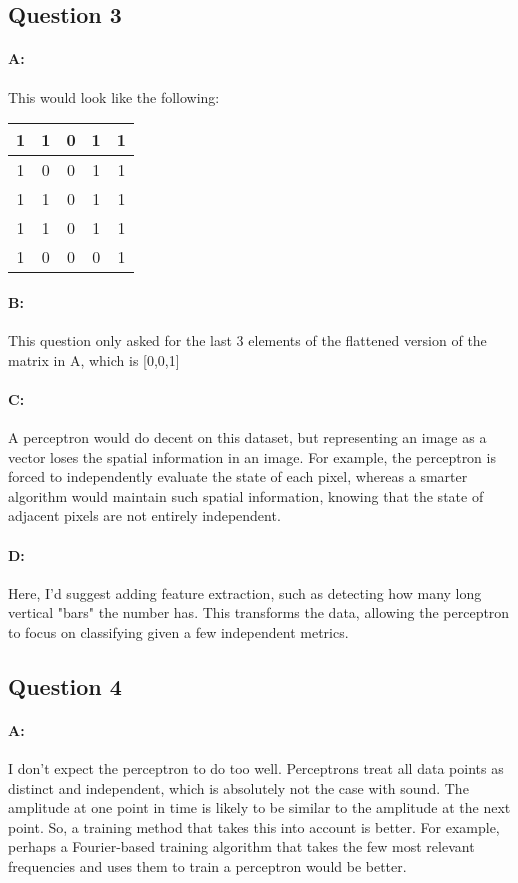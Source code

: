 \documentclass{article}
\begin{document}
\subsection{Question 3}

\paragraph{A: } This would look like the following: \newline
\begin{tabular}{|c|c|c|c|c|}
    \hline
    1&1&0&1&1 \\
    \hline
    1&0&0&1&1 \\
    \hline
    1&1&0&1&1 \\
    \hline
    1&1&0&1&1 \\
    \hline
    1&0&0&0&1 \\
    \hline
\end{tabular}

\paragraph{B: } This question only asked for the last 3 elements of the flattened version of the matrix in A, which is [0,0,1]

\paragraph{C: } A perceptron would do decent on this dataset, but representing an image as a vector loses the spatial information in an image. For example, the perceptron is forced to independently evaluate the state of each pixel, whereas a smarter algorithm would maintain such spatial information, knowing that the state of adjacent pixels are not entirely independent.

\paragraph{D: } Here, I'd suggest adding feature extraction, such as detecting how many long vertical "bars" the number has. This transforms the data, allowing the perceptron to focus on classifying given a few independent metrics.

\subsection{Question 4}

\paragraph{A: } I don't expect the perceptron to do too well. Perceptrons treat all data points as distinct and independent, which is absolutely not the case with sound. The amplitude at one point in time is likely to be similar to the amplitude at the next point. So, a training method that takes this into account is better. For example, perhaps a Fourier-based training algorithm that takes the few most relevant frequencies and uses them to train a perceptron would be better.
\end{document}
